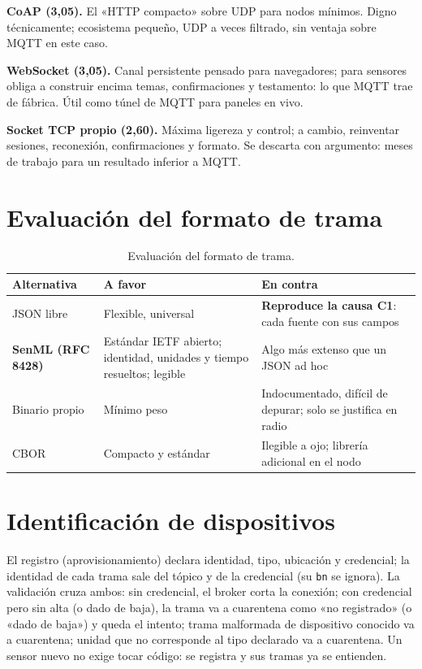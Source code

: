 \textbf{CoAP (3,05).} El «HTTP compacto» sobre UDP para nodos mínimos. Digno técnicamente;
ecosistema pequeño, UDP a veces filtrado, sin ventaja sobre MQTT en este caso.

\textbf{WebSocket (3,05).} Canal persistente pensado para navegadores; para sensores obliga a
construir encima temas, confirmaciones y testamento: lo que MQTT trae de fábrica. Útil como túnel de
MQTT para paneles en vivo.

\textbf{Socket TCP propio (2,60).} Máxima ligereza y control; a cambio, reinventar sesiones,
reconexión, confirmaciones y formato. Se descarta con argumento: meses de trabajo para un resultado
inferior a MQTT.

\section{Evaluación del formato de trama}

\begin{table}[H]
\centering\footnotesize
\begin{tablaseg}
\begin{tabular}{@{}L{2.6cm}L{4.6cm}L{5.6cm}@{}}
\toprule
\textbf{Alternativa} & \textbf{A favor} & \textbf{En contra} \\
\midrule
JSON libre & Flexible, universal & \textbf{Reproduce la causa C1}: cada fuente con sus campos \\
\textbf{SenML (RFC 8428)} & Estándar IETF abierto; identidad, unidades y tiempo resueltos; legible & Algo más extenso que un JSON ad hoc \\
Binario propio & Mínimo peso & Indocumentado, difícil de depurar; solo se justifica en radio \\
CBOR & Compacto y estándar & Ilegible a ojo; librería adicional en el nodo \\
\bottomrule
\end{tabular}
\end{tablaseg}
\caption{Evaluación del formato de trama.}
\label{tab:formato}
\end{table}

\section{Identificación de dispositivos}

El registro (aprovisionamiento) declara identidad, tipo, ubicación y credencial; la identidad de
cada trama sale del tópico y de la credencial (su \texttt{bn} se ignora). La validación cruza ambos: sin credencial, el broker
corta la conexión; con credencial pero sin alta (o dado de baja), la trama va a cuarentena como
«no registrado» (o «dado de baja») y queda el intento; trama malformada de dispositivo conocido va a cuarentena; unidad
que no corresponde al tipo declarado va a cuarentena. Un sensor nuevo no exige tocar código: se
registra y sus tramas ya se entienden.

